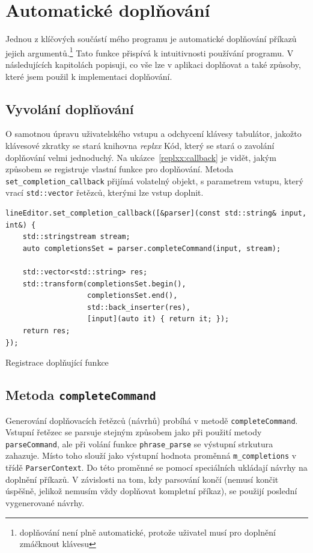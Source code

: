 \documentclass[thesis=B,czech,hidelinks]{FITthesis}[2019/03/06]
\begin{document}
\section{Automatické doplňování}\label{completion}
Jednou z klíčových součástí mého programu je automatické doplňování příkazů jejich argumentů.\footnote{doplňování není plně automatické, protože uživatel musí pro doplnění zmáčknout klávesu} Tato funkce přispívá k intuitivnosti používání programu. V následujících kapitolách popisuji, co vše lze v aplikaci doplňovat a také způsoby, které jsem použil k implementaci doplňování.

\subsection{Vyvolání doplňování}
O samotnou úpravu uživatelského vstupu a odchycení klávesy tabulátor, jakožto klávesové zkratky se stará knihovna \textit{replxx} Kód, který se stará o zavolání doplňování velmi jednoduchý. Na ukázce~\ref{replxx:callback} je vidět, jakým způsobem se registruje vlastní funkce pro doplňování. Metoda \texttt{set\_completion\_callback} přijímá volatelný objekt, s parametrem vstupu, který vrací \texttt{std::vector} řetězců, kterými lze vstup doplnit.

\begin{listing}
\begin{verbatim}
lineEditor.set_completion_callback([&parser](const std::string& input, int&) {
    std::stringstream stream;
    auto completionsSet = parser.completeCommand(input, stream);

    std::vector<std::string> res;
    std::transform(completionsSet.begin(),
                   completionsSet.end(),
                   std::back_inserter(res),
                   [input](auto it) { return it; });
    return res;
});
\end{verbatim}
\caption{Registrace doplňující funkce}\label{replxx:callback}
\end{listing}

\subsection{Metoda \texttt{completeCommand}}
Generování doplňovacích řetězců (návrhů) probíhá v metodě \texttt{completeCommand}. Vstupní řetězec se parsuje stejným způsobem jako při použití metody \texttt{parseCommand}, ale při volání funkce \texttt{phrase\_parse} se výstupní strkutura zahazuje. Místo toho slouží jako výstupní hodnota proměnná \texttt{m\_completions} v třídě \texttt{ParserContext}. Do této proměnné se pomocí speciálních  ukládají návrhy na doplnění příkazů. V závislosti na tom, kdy parsování končí (nemusí končit úspěšně, jelikož nemusím vždy doplňovat kompletní příkaz), se použijí poslední vygenerované návrhy.
\end{document}
